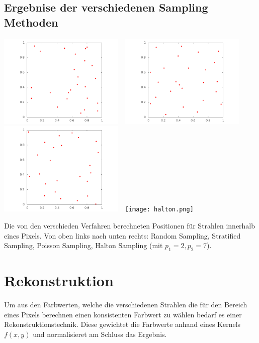 \documentclass[a4paper]{article}
\begin{document}
\subsection*{Ergebnise der verschiedenen Sampling Methoden}
\begin{center}
	\includegraphics[width=0.45\textwidth]{random.png}~~\includegraphics[width=0.45\textwidth]{stratified.png}\\
	\vspace{5pt}
	\includegraphics[width=0.45\textwidth]{poisson.png}~~\texttt{[image: halton.png]}\\
\end{center}
Die von den verschieden Verfahren berechneten Positionen für Strahlen innerhalb eines Pixels. Von oben links nach unten rechts: Random Sampling, Stratified Sampling, Poisson Sampling, Halton Sampling (mit $p_1 = 2, p_2 = 7$).

\section*{Rekonstruktion}
Um aus den Farbwerten, welche die verschiedenen Strahlen die für den Bereich eines Pixels berechnen einen konsistenten Farbwert zu wählen bedarf es einer Rekonstruktionstechnik. Diese gewichtet die Farbwerte anhand eines Kernels $f(x,y)$ und normalisieret am Schluss das Ergebnis.
\end{document}
